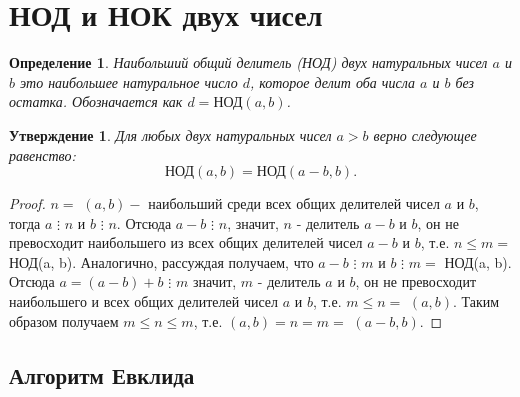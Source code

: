 \documentclass[12pt, a4paper, openany]{book}
\newtheorem*{definition}{Определение}
\newtheorem*{statement}{Утверждение}
\begin{document}
\newpage
\section{НОД и НОК двух чисел}

\begin{definition}
Наибольший общий делитель (НОД) двух натуральных чисел \(a\) и \(b\) это наибольшее натуральное число \(d\), которое делит оба числа \(a\) и \(b\) без остатка. Обозначается как \(d = \text{НОД}(a, b)\).
\end{definition}

\begin{statement}
Для любых двух натуральных чисел $a > b$ верно следующее равенство:
\begin{equation*}
\text{НОД}(a, b) = \text{НОД}(a - b, b).
\end{equation*}
\end{statement}

\begin{proof}
$n=$ $(a, b) - $ наибольший среди всех общих делителей чисел $a$ и $b$, тогда $a$ $\vdots$ $n$ и $b$ $\vdots$ $n$.
Отсюда $a-b$ $\vdots$ $n$, значит, $n$ - делитель $a-b$ и $b$, он не превосходит наибольшего из всех общих делителей чисел $a-b$ и $b$, т.е. $n \leqslant m=$ $\text{НОД}$(a, b). Аналогично, рассуждая получаем, что $a-b$ $\vdots$ $m$ и $b$ $\vdots$ $m=$ $\text{НОД}$(a, b). Отсюда $a=(a-b)+b$ $\vdots$ $m$ значит, $m$ - делитель $a$ и $b$, он не превосходит наибольшего и всех общих делителей чисел $a$ и $b$, т.е. $m \leqslant n=$ $(a, b)$. Таким образом получаем $m \leqslant n \leqslant m$, т.е. $(a, b)=n=m=$ $(a-b, b)$.
\end{proof}

\noindent
\subsection{Алгоритм Евклида}
\end{document}
